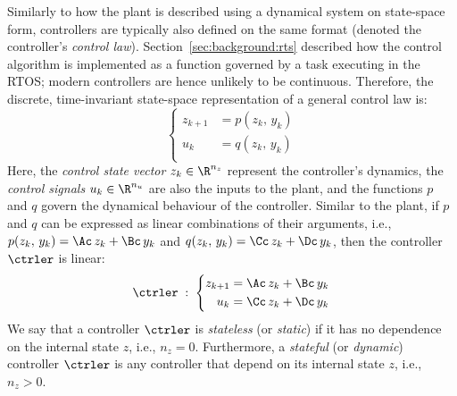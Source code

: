Similarly to how the plant is described using a dynamical system on state-space form, controllers are typically also defined on the same format (denoted the controller's \emph{control law}).
Section~\ref{sec:background:rts} described how the control algorithm is implemented as a function governed by a task executing in the RTOS; modern controllers are hence unlikely to be continuous.
Therefore, the discrete, time-invariant state-space representation of a general control law is:
%
\begin{equation}%
    \label{eq:discrete-state-space}%
    \left\{\begin{aligned}
        z_{k+1} &= p(z_k,\, y_k) \\
        u_k &= q(z_k,\, y_k) \\
    \end{aligned}\right.
\end{equation}
%
Here, the \emph{control state vector} $z_k \in \R^{n_z}$ represent the controller's dynamics, the \emph{control signals} $u_k \in \R^{n_u}$ are also the inputs to the plant, and the functions $p$ and $q$ govern the dynamical behaviour of the controller.
Similar to the plant, if $p$ and $q$ can be expressed as linear combinations of their arguments, i.e., $p(z_k,\, y_k) = \Ac\,z_k+\Bc\,y_k$ and $q(z_k,\, y_k) = \Cc\,z_k+\Dc\,y_k$, then the controller $\ctrler$ is linear:
%
\begin{equation}%
    \label{eq:discrete-lti-ctrler}%
    \ctrler \; : \; \left\{\begin{aligned}
        z_{k+1} &= \Ac\,z_k + \Bc\,y_k \\
        u_k &= \Cc\,z_k + \Dc\,y_k \\
    \end{aligned}\right.
\end{equation}
%
We say that a controller $\ctrler$ is \emph{stateless} (or \emph{static}) if it has no dependence on the internal state $z$, i.e., $n_z = 0$.
Furthermore, a \emph{stateful} (or \emph{dynamic}) controller $\ctrler$ is any controller that depend on its internal state $z$, i.e., $n_z > 0$.

